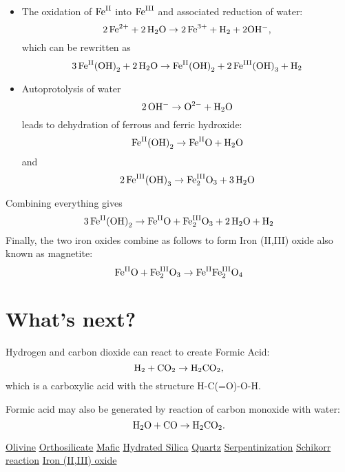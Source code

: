 \documentclass[a4paper,14pt]{extarticle}
\def\H{{\rm H}}
\def\O{{\rm O}}
\def\C{{\rm C}}
\def\Fe{{\rm Fe}}
\def\II{{\rm II}}
\def\III{{\rm III}}
\begin{document}
\begin{itemize}
    \item
The oxidation of $\Fe^{\II}$ into $\Fe^{\III}$ and associated reduction of water:
\[
    2\, \Fe^{2+} + 2\, \H_2\O \rightarrow 2\, \Fe^{3+} + \H_2 + 2\O\H^-,
\]
which can be rewritten as
\[
    3\, \Fe^{\II}{(\O\H)}_2 + 2\, \H_2\O \rightarrow \Fe^{\II}{(\O\H)}_2 + 2\, \Fe^{\III}{(\O\H)}_3 + \H_2
\]

    \item
        Autoprotolysis of water
\[
    2\, \O\H^- \rightarrow \O^{2-} + \H_2\O
\]
leads to dehydration of ferrous and ferric hydroxide:
\[
    \Fe^{\II}{(\O\H)}_2 \rightarrow \Fe^{\II}\O + \H_2\O
\]
and
\[
    2\,\Fe^{\III}{(\O\H)}_3 \rightarrow \Fe^{\III}_2\O_3 + 3\,\H_2\O
\]
\end{itemize}
Combining everything gives
\[
    3\, \Fe^{\II}{(\O\H)}_2 \rightarrow \Fe^{\II}\O + \Fe^{\III}_2\O_3 + 2\,\H_2\O + \H_2
\]
Finally, the two iron oxides combine as follows to form Iron (II,III) oxide\cite{iron_ii_iii_oxide} also known as
magnetite:
\[
    \Fe^{\II}\O + \Fe_2^{\III}\O_3 \rightarrow \Fe^{\II}\Fe^{\III}_2\O_4
\]



\section{What's next?}
Hydrogen and carbon dioxide can react to create Formic Acid:
\[
    \H_2 + \C\O_2 \rightarrow \H_2\C\O_2,
\]
which is a carboxylic acid with the structure H-C(=O)-O-H.

Formic acid may also be generated by reaction of carbon monoxide with water:
\[
    \H_2\O + \C\O \rightarrow \H_2\C\O_2.
\]



\begin{thebibliography}{9}
               \href{https://en.wikipedia.org/wiki/Olivine}{Olivine}
         \href{https://en.wikipedia.org/wiki/Orthosilicate}{Orthosilicate}
                 \href{https://en.wikipedia.org/wiki/Mafic}{Mafic}
       \href{https://en.wikipedia.org/wiki/Hydrated_silica}{Hydrated Silica}
                \href{https://en.wikipedia.org/wiki/Quartz}{Quartz}
      \href{https://en.wikipedia.org/wiki/Serpentinization}{Serpentinization}
     \href{https://en.wikipedia.org/wiki/Schikorr_reaction}{Schikorr reaction}
     \href{https://en.wikipedia.org/wiki/Iron(II,III)_oxide}{Iron (II,III) oxide}
\end{thebibliography}
\end{document}
